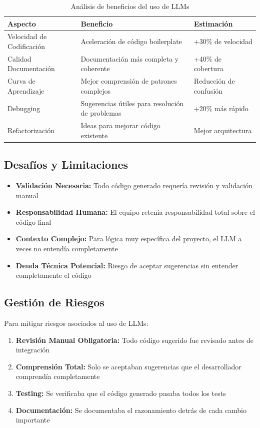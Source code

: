 \documentclass[12pt, a4paper]{article}
\begin{document}
\begin{table}[H]
    \centering
    \begin{tabularx}{\textwidth}{|X|X|X|}
        \hline
        \textbf{Aspecto} & \textbf{Beneficio} & \textbf{Estimación} \\
        \hline
        Velocidad de Codificación & Aceleración de código boilerplate & +30\% de velocidad \\
        \hline
        Calidad Documentación & Documentación más completa y coherente & +40\% de cobertura \\
        \hline
        Curva de Aprendizaje & Mejor comprensión de patrones complejos & Reducción de confusión \\
        \hline
        Debugging & Sugerencias útiles para resolución de problemas & +20\% más rápido \\
        \hline
        Refactorización & Ideas para mejorar código existente & Mejor arquitectura \\
        \hline
    \end{tabularx}
    \caption{Análisis de beneficios del uso de LLMs}
\end{table}

\subsection{Desafíos y Limitaciones}

\begin{itemize}[leftmargin=2em]
    \item \textbf{Validación Necesaria:} Todo código generado requería revisión y validación manual
    \item \textbf{Responsabilidad Humana:} El equipo retenía responsabilidad total sobre el código final
    \item \textbf{Contexto Complejo:} Para lógica muy específica del proyecto, el LLM a veces no entendía completamente
    \item \textbf{Deuda Técnica Potencial:} Riesgo de aceptar sugerencias sin entender completamente el código
\end{itemize}

\subsection{Gestión de Riesgos}

Para mitigar riesgos asociados al uso de LLMs:

\begin{enumerate}[leftmargin=2em]
    \item \textbf{Revisión Manual Obligatoria:} Todo código sugerido fue revisado antes de integración
    \item \textbf{Comprensión Total:} Solo se aceptaban sugerencias que el desarrollador comprendía completamente
    \item \textbf{Testing:} Se verificaba que el código generado pasaba todos los tests
    \item \textbf{Documentación:} Se documentaba el razonamiento detrás de cada cambio importante
\end{enumerate}
\end{document}
